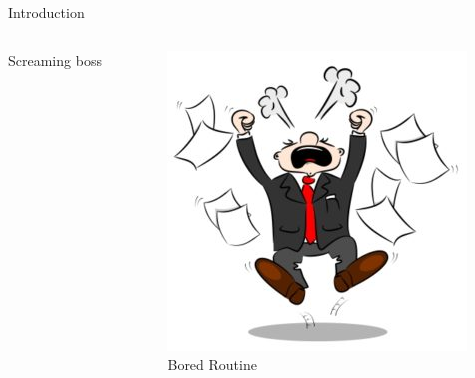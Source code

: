 \begin{frame}{Introduction}
\begin{columns}
\begin{column}{.4\textwidth}
\begin{center}
        Screaming boss
        \end{center}
    \end{column}
    \hspace*{-0.5cm}
    \begin{column}{.4\textwidth}
        \begin{center} \includegraphics[scale=0.2]{figures/hate.jpg}\\
        Bored Routine
        \end{center}
    \end{column}
\end{columns}
\end{frame}
